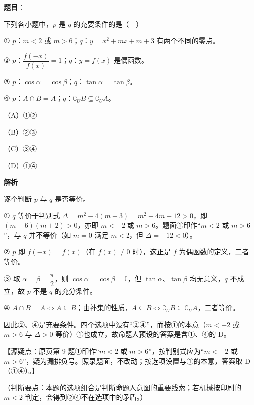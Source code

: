 \begin{answer}

\textbf{题目}：

下列各小题中，$p$ 是 $q$ 的充要条件的是（　）

① $p$：$m<2$ 或 $m>6$；$q$：$y=x^2+mx+m+3$ 有两个不同的零点。

② $p$：$\dfrac{f(-x)}{f(x)}=1$；$q$：$y=f(x)$ 是偶函数。

③ $p$：$\cos\alpha=\cos\beta$；$q$：$\tan\alpha=\tan\beta$。

④ $p$：$A\cap B=A$；$q$：$\complement_U B\subseteq\complement_U A$。

（A）①②

（B）②③

（C）③④

（D）①④

\textbf{解析}

逐个判断 $p$ 与 $q$ 是否等价。

① $q$ 等价于判别式 $\Delta=m^2-4(m+3)=m^2-4m-12>0$，即 $(m-6)(m+2)>0$，亦即 $m<-2$ 或 $m>6$。题面①印作“$m<2$ 或 $m>6$”，与 $q$ 并不等价（如 $m=0$ 满足 $m<2$，但 $\Delta=-12<0$）。

② $p$ 即 $f(-x)=f(x)$（在 $f(x)\neq0$ 时），这正是 $f$ 为偶函数的定义，二者等价。

③ 取 $\alpha=\beta=\dfrac{\pi}{2}$，则 $\cos\alpha=\cos\beta=0$，但 $\tan\alpha$、$\tan\beta$ 均无意义，$q$ 不成立，故 $p$ 不是 $q$ 的充分条件。

④ $A\cap B=A\iff A\subseteq B$；由补集的性质，$A\subseteq B\iff\complement_UB\subseteq\complement_UA$，二者等价。

因此②、④是充要条件。四个选项中没有“②④”，而按①的本意（$m<-2$ 或 $m>6$ 与 $\Delta>0$ 等价）①也成立，故命题人预设的答案是含①、④的 D。

【源疑点：原页第 9 题①印作“$m<2$ 或 $m>6$”，按判别式应为“$m<-2$ 或 $m>6$”，疑为漏排负号。照录题面，不改动；按选项设置与①的本意，答案取 D（①④）。】

（判断要点：本题的选项组合是判断命题人意图的重要线索；若机械按印刷的 $m<2$ 判定，会得到②④不在选项中的矛盾。）


\end{answer}
